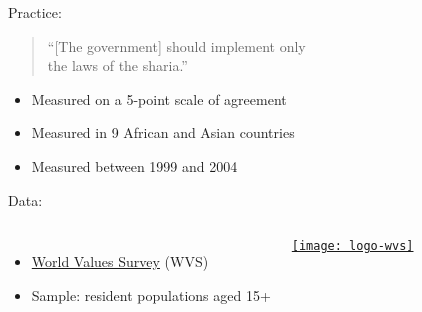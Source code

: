 \documentclass[t]{beamer}
\begin{document}
	\begin{frame}[t]{Practice: }

		\begin{quote}
		``[The government] should implement only \\
		the laws of the sharia.''\\[1em]
		\end{quote}
		
		\begin{itemize}
			\item Measured on a 5-point scale of agreement
			\item Measured in 9 African and Asian countries
			\item Measured between 1999 and 2004
		\end{itemize}

		\vspace{1em}
		
    Data:
	
			\begin{columns}[c]
				
				\begin{itemize}
					\item \href{http://www.worldvaluessurvey.org/wvs.jsp}{World Values Survey} (WVS)%
					\item Sample: resident populations aged 15+
				\end{itemize}
	
				\href{http://www.worldvaluessurvey.org/wvs.jsp}{\texttt{[image: logo-wvs]}}%
			\end{columns}
	
	\end{frame}

  
\end{document}
